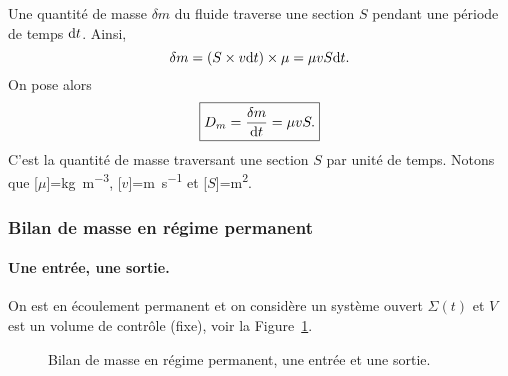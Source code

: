             Une quantité de masse $\delta m$ du fluide traverse une section $S$ pendant une période de temps $\mathrm{d} t$. Ainsi,
            \begin{equation}
                \delta m=(S\times v\mathrm{d} t)\times\mu=\mu v S\mathrm{d} t.
            \end{equation}
            On pose alors 
            \begin{equation}
                \boxed{
                    D_m=\frac{\delta m}{\mathrm{d} t}=\mu v S.
                }
            \end{equation}
            C'est la quantité de masse traversant une section $S$ par unité de temps. Notons que [$\mu$]=\si[]{\kilogram\per\metre\cubed}, [$v$]=\si[]{\metre\per\second} et [$S$]=\si[]{\metre\squared}.

        \subsubsection{Bilan de masse en régime permanent}

            \paragraph{Une entrée, une sortie.}

                On est en écoulement permanent et on considère un système ouvert $\Sigma(t)$ et $V$ est un volume de contrôle (fixe), voir la Figure~\ref{fig:bilan_masse_regime_permanent_une_entree_une_sortie}.

                \begin{figure}
                    \centering
                    \caption{Bilan de masse en régime permanent, une entrée et une sortie.}    
                    \label{fig:bilan_masse_regime_permanent_une_entree_une_sortie}
                \end{figure}

